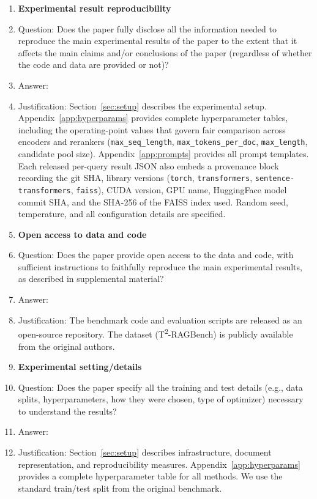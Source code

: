 \begin{enumerate}
    \item {\bf Experimental result reproducibility}
    \item[] Question: Does the paper fully disclose all the information needed to reproduce the main experimental results of the paper to the extent that it affects the main claims and/or conclusions of the paper (regardless of whether the code and data are provided or not)?
    \item[] Answer: \answerYes{}
    \item[] Justification: Section~\ref{sec:setup} describes the experimental setup. Appendix~\ref{app:hyperparams} provides complete hyperparameter tables, including the operating-point values that govern fair comparison across encoders and rerankers (\texttt{max\_seq\_length}, \texttt{max\_tokens\_per\_doc}, \texttt{max\_length}, candidate pool size). Appendix~\ref{app:prompts} provides all prompt templates. Each released per-query result JSON also embeds a provenance block recording the git SHA, library versions (\texttt{torch}, \texttt{transformers}, \texttt{sentence-transformers}, \texttt{faiss}), CUDA version, GPU name, HuggingFace model commit SHA, and the SHA-256 of the FAISS index used. Random seed, temperature, and all configuration details are specified.


\item {\bf Open access to data and code}
    \item[] Question: Does the paper provide open access to the data and code, with sufficient instructions to faithfully reproduce the main experimental results, as described in supplemental material?
    \item[] Answer: \answerYes{}
    \item[] Justification: The benchmark code and evaluation scripts are released as an open-source repository. The dataset (T\textsuperscript{2}-RAGBench) is publicly available from the original authors.

\item {\bf Experimental setting/details}
    \item[] Question: Does the paper specify all the training and test details (e.g., data splits, hyperparameters, how they were chosen, type of optimizer) necessary to understand the results?
    \item[] Answer: \answerYes{}
    \item[] Justification: Section~\ref{sec:setup} describes infrastructure, document representation, and reproducibility measures. Appendix~\ref{app:hyperparams} provides a complete hyperparameter table for all methods. We use the standard train/test split from the original benchmark.


\end{enumerate}
